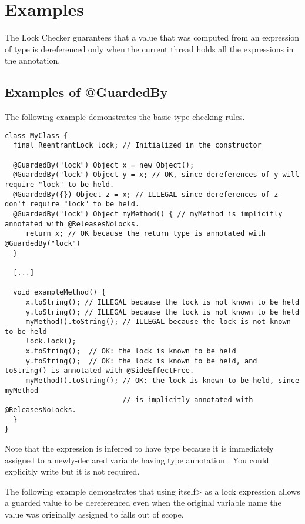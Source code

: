 \section{Examples\label{lock-examples}}

The Lock Checker guarantees that a value that was computed from an expression of  type is
dereferenced only when the current thread holds all the expressions in the
 annotation.

\subsection{Examples of @GuardedBy\label{lock-examples-guardedby}}

The following example demonstrates the basic
type-checking rules.

\begin{Verbatim}
class MyClass {
  final ReentrantLock lock; // Initialized in the constructor

  @GuardedBy("lock") Object x = new Object();
  @GuardedBy("lock") Object y = x; // OK, since dereferences of y will require "lock" to be held.
  @GuardedBy({}) Object z = x; // ILLEGAL since dereferences of z don't require "lock" to be held.
  @GuardedBy("lock") Object myMethod() { // myMethod is implicitly annotated with @ReleasesNoLocks.
     return x; // OK because the return type is annotated with @GuardedBy("lock")
  }

  [...]

  void exampleMethod() {
     x.toString(); // ILLEGAL because the lock is not known to be held
     y.toString(); // ILLEGAL because the lock is not known to be held
     myMethod().toString(); // ILLEGAL because the lock is not known to be held
     lock.lock();
     x.toString();  // OK: the lock is known to be held
     y.toString();  // OK: the lock is known to be held, and toString() is annotated with @SideEffectFree.
     myMethod().toString(); // OK: the lock is known to be held, since myMethod
                            // is implicitly annotated with @ReleasesNoLocks.
  }
}
\end{Verbatim}

Note that the expression  is inferred to have type 
because it is immediately assigned to a newly-declared
variable having type annotation .  You could
explicitly write  but it is not
required.

The following example demonstrates that using \<itself> as a lock expression
allows a guarded value to be dereferenced even when the original
variable name the value was originally assigned to falls out of scope.

